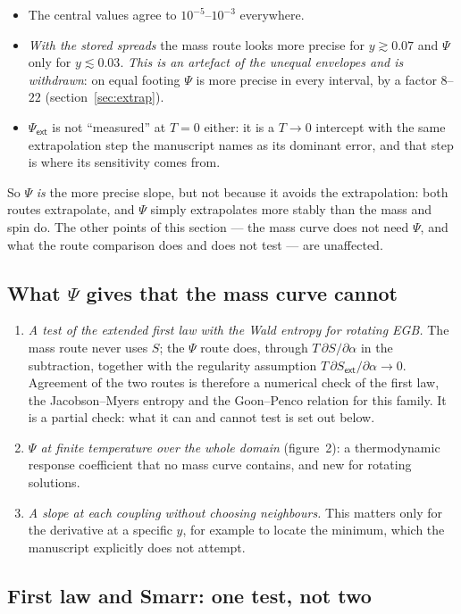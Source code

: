 \documentclass[11pt,a4paper]{article}
\newcommand{\q}[1]{\subsection*{\color{accent}#1}}
\newcommand{\ext}{\mathsf{ext}}
\begin{document}
\begin{itemize}\itemsep3pt
  \item The central values agree to $10^{-5}$--$10^{-3}$ everywhere.
  \item \emph{With the stored spreads} the mass route looks more precise for
  $y\gtrsim0.07$ and $\Psi$ only for $y\lesssim0.03$. \emph{This is an artefact
  of the unequal envelopes and is withdrawn}: on equal footing $\Psi$ is more
  precise in every interval, by a factor $8$--$22$ (section~\ref{sec:extrap}).
  \item $\Psi_\ext$ is not ``measured'' at $T=0$ either: it is a $T\to0$
  intercept with the same extrapolation step the manuscript names as its
  dominant error, and that step is where its sensitivity comes from.
\end{itemize}
So $\Psi$ \emph{is} the more precise slope, but not because it avoids the
extrapolation: both routes extrapolate, and $\Psi$ simply extrapolates more
stably than the mass and spin do. The other points of this section --- the mass
curve does not need $\Psi$, and what the route comparison does and does not
test --- are unaffected.

\q{What $\Psi$ gives that the mass curve cannot}

\begin{enumerate}\itemsep3pt
  \item \emph{A test of the extended first law with the Wald entropy for
  rotating EGB.} The mass route never uses $S$; the $\Psi$ route does, through
  $T\,\partial S/\partial\alpha$ in the subtraction, together with the
  regularity assumption $T\,\partial S_\ext/\partial\alpha\to0$. Agreement of
  the two routes is therefore a numerical check of the first law, the
  Jacobson--Myers entropy and the Goon--Penco relation for this family. It is a
  partial check: what it can and cannot test is set out below.
  \item \emph{$\Psi$ at finite temperature over the whole domain}
  (figure~2): a thermodynamic response coefficient that no mass curve
  contains, and new for rotating solutions.
  \item \emph{A slope at each coupling without choosing neighbours.} This
  matters only for the derivative at a specific $y$, for example to locate the
  minimum, which the manuscript explicitly does not attempt.
\end{enumerate}

\q{First law and Smarr: one test, not two}
\end{document}
